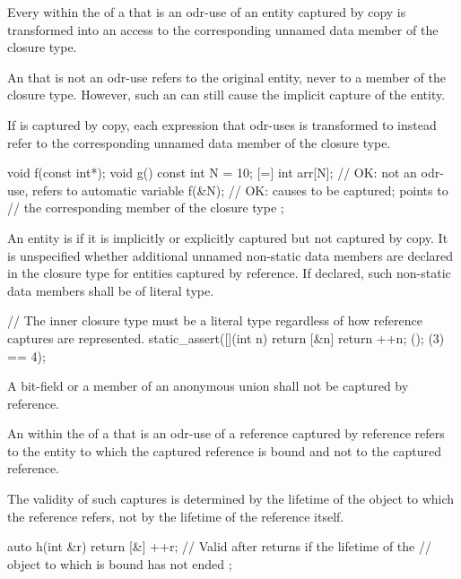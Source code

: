 \pnum
Every  within the  of a
 that is an odr-use of an
entity captured by copy is transformed into an access to the corresponding unnamed data
member of the closure type.
\begin{note}
An  that is not an odr-use refers to
the original entity, never to a member of the closure type.
However, such
an  can still cause the implicit capture of the
entity.
\end{note}
If  is captured by copy, each expression that odr-uses  is
transformed to instead refer to the corresponding unnamed data member of the closure type.
\begin{example}
\begin{codeblock}
void f(const int*);
void g() {
  const int N = 10;
  [=] {
    int arr[N];     // OK: not an odr-use, refers to automatic variable
    f(&N);          // OK: causes  to be captured;  points to
                    // the corresponding member of the closure type
  };
}
\end{codeblock}
\end{example}

\pnum
An entity is  if it is implicitly or explicitly
captured but not captured by copy. It is unspecified whether additional unnamed
non-static data members are declared in the closure type for entities captured by
reference.
If declared, such non-static data members shall be of literal type.
\begin{example}
\begin{codeblock}
// The inner closure type must be a literal type regardless of how reference captures are represented.
static_assert([](int n) { return [&n] { return ++n; }(); }(3) == 4);
\end{codeblock}
\end{example}
A bit-field or a member of an anonymous union
shall not be captured by reference.

\pnum
An  within
the  of a 
that is an odr-use of a reference captured by reference
refers to the entity to which the captured reference is bound and
not to the captured reference.
\begin{note}
The validity of such captures is determined by
the lifetime of the object to which the reference refers,
not by the lifetime of the reference itself.
\end{note}
\begin{example}
\begin{codeblock}
auto h(int &r) {
  return [&] {
    ++r;            // Valid after  returns if the lifetime of the
                    // object to which  is bound has not ended
  };
}
\end{codeblock}
\end{example}

